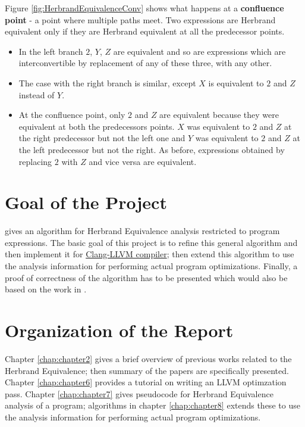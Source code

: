 Figure \ref{fig:HerbrandEquivalenceConv} shows what happens at a 
\textbf{confluence point} - a point where multiple paths meet. Two 
expressions are Herbrand equivalent only if they are Herbrand 
equivalent at all the predecessor points.
\begin{itemize}
    \item   In the left branch $2$, $Y$, $Z$ are equivalent and 
    so are expressions which are interconvertible by replacement 
    of any of these three, with any other.
    \item   The case with the right branch is similar, except $X$ is 
    equivalent to $2$ and $Z$ instead of $Y$.
    \item   At the confluence point, only $2$ and $Z$ are equivalent 
    because they were equivalent at both the predecessors points. $X$ 
    was equivalent to $2$ and $Z$ at the right predecessor but not 
    the left one and $Y$ was equivalent to $2$ and $Z$ at the left 
    predecessor but not the right. As before, expressions obtained by 
    replacing $2$ with $Z$ and vice versa are equivalent.
\end{itemize}

\section{Goal of the Project}
\label{sec:GoalOfTheProject}
\cite{Babu} gives an algorithm for Herbrand Equivalence analysis
restricted to program expressions. The basic goal of this project 
is to refine this general algorithm and then implement it for 
\href{https://llvm.org/}{Clang-LLVM compiler}; then extend this 
algorithm to use the analysis information for performing actual program
optimizations. Finally, a proof of correctness of the algorithm has 
to be presented which would also be based on the work in \cite{Babu}.

\section{Organization of the Report}
\label{sec:OrganizationOfTheReport}
Chapter \ref{chap:chapter2} gives a brief overview of previous works 
related to the Herbrand Equivalence; then summary of the 
papers \cite{Gulwani, Saleena, Babu} are specifically presented. Chapter 
\ref{chap:chapter6} provides a tutorial on writing an LLVM 
optimzation pass. Chapter \ref{chap:chapter7} gives pseudocode for Herbrand 
Equivalence analysis of a program; algorithms in chapter \ref{chap:chapter8} 
extends these to use the analysis information for performing actual program 
optimizations.
